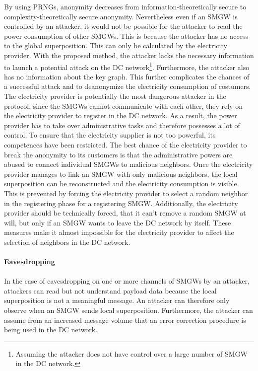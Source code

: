 By using PRNGs, anonymity decreases from information-theoretically secure to complexity-theoretically secure anonymity. Nevertheless even if an \gls{SMGW} is controlled by an attacker, it would not be possible for the attacker to read the power consumption of other \gls{SMGW}s. This is because the attacker has no access to the global superposition. This can only be calculated by the electricity provider. With the proposed method, the attacker lacks the necessary information to launch a potential attack on the DC network\footnote[4]{Assuming the attacker does not have control over a large number of \gls{SMGW} in the DC network.}. Furthermore, the attacker also has no information about the key graph. This further complicates the chances of a successful attack and to deanonymize the electricity consumption of costumers. The electricity provider is potentially the most dangerous attacker in the protocol, since the \gls{SMGW}s cannot communicate with each other, they rely on the electricity provider to register in the DC network. As a result, the power provider has to take over administrative tasks and therefore possesses a lot of control. To ensure that the electricity supplier is not too powerful, its competences have been restricted. The best chance of the electricity provider to break the anonymity to its customers is that the administrative powers are abused to connect individual \gls{SMGW}s to malicious neighbors. Once the electricity provider manages to link an \gls{SMGW} with only malicious neighbors, the local superposition can be reconstructed and the electricity consumption is visible. This is prevented by forcing the electricity provider to select a random neighbor in the registering phase for a registering \gls{SMGW}. Additionally, the electricity provider should be technically forced, that it can't remove a random \gls{SMGW} at will, but only if an \gls{SMGW} wants to leave the DC network by itself. These measures make it almost impossible for the electricity provider to affect the selection of neighbors in the DC network.
\\
\\
\textbf{Eavesdropping}
\\
\\
In the case of eavesdropping on one or more channels of \gls{SMGW}s by an attacker, attackers can read but not understand payload data because the local superposition is not a meaningful message. An attacker can therefore only observe when an \gls{SMGW} sends local superposition. Furthermore, the attacker can assume from an increased message volume that an error correction procedure is being used in the DC network. 
